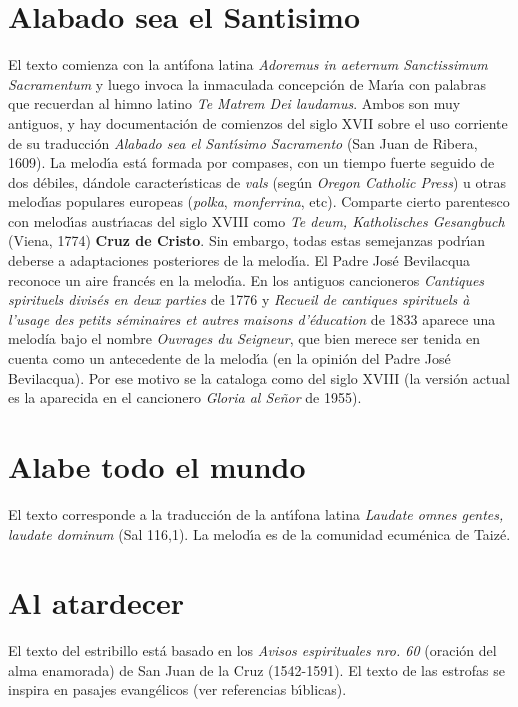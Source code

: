 \documentclass[landscape,12pt]{report}
\begin{document}
\section*{\small Alabado sea el Santisimo} \noindent\footnotesize El texto comienza con la ant\'\i fona latina \textit{Adoremus in aeternum Sanctissimum Sacramentum} y luego invoca la inmaculada concepci\'on de Mar\'\i a con palabras que recuerdan al himno latino \textit{Te Matrem Dei laudamus}. Ambos son muy antiguos, y hay documentaci\'on de comienzos del siglo XVII sobre el uso corriente de su traducci\'on \textit{Alabado sea el Sant\'\i simo Sacramento} (San Juan de Ribera, 1609). La melod\'\i a est\'a formada por compases, con un tiempo fuerte seguido de dos d\'ebiles, d\'andole caracter\'\i sticas de \textit{vals} (seg\'un \textit{Oregon Catholic Press}) u otras melod\'\i as populares europeas (\textit{polka}, \textit{monferrina}, etc). Comparte cierto parentesco con melod\'\i as austr\'\i acas del siglo XVIII como \textit{Te deum, Katholisches Gesangbuch} (Viena, 1774) \textbf{Cruz de Cristo}. Sin embargo, todas estas semejanzas podr\'\i an deberse a adaptaciones posteriores de la melod\'\i a. El 
Padre Jos\'e Bevilacqua reconoce un aire franc\'es en la melod\'\i a. En los antiguos cancioneros \emph{Cantiques spirituels divis\'es en deux parties} de 1776 y \emph{Recueil de cantiques spirituels \`{a} l'usage des petits s\'eminaires et autres maisons d'\'education} de 1833 aparece una melod\'ia bajo el nombre \emph{Ouvrages du Seigneur}, que bien merece ser tenida en cuenta como un antecedente de la melod\'\i a (en la opini\'on del Padre Jos\'e Bevilacqua). Por ese motivo se la cataloga como del siglo XVIII (la versi\'on actual es la aparecida en el cancionero \textit{Gloria al Se\~nor} de 1955).
\section*{\small Alabe todo el mundo} \noindent\footnotesize El texto corresponde a la traducción de la ant\'\i fona latina \emph{Laudate omnes gentes, laudate dominum} (Sal 116,1). La melod\'\i a es de la comunidad ecum\'enica de Taiz\'e.
\section*{\small Al atardecer} \noindent\footnotesize El texto del estribillo est\'a basado en los \emph{Avisos espirituales nro. 60} (oraci\'on del alma enamorada) de San Juan de la Cruz (1542-1591). El texto de las estrofas se inspira en pasajes evang\'elicos (ver referencias b\'\i blicas). 
\end{document}
